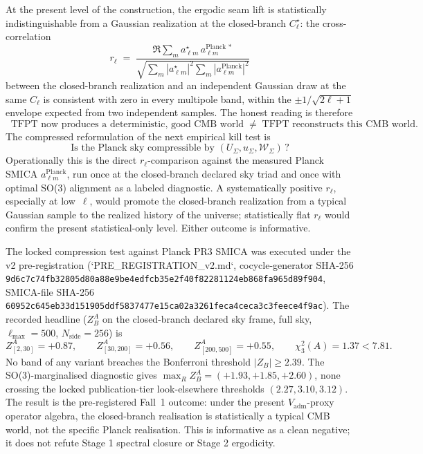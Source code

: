 
\begin{remark}
\label{rem:good-vs-this-cmb-world}
At the present level of the construction, the ergodic seam lift is statistically indistinguishable
from a Gaussian realization at the closed-branch $C_\ell^\star$: the cross-correlation
\[
r_\ell\;=\;\frac{\Re\sum_m a_{\ell m}^{\star}\,a_{\ell m}^{\mathrm{Planck}\,\ast}}
{\sqrt{\sum_m|a_{\ell m}^{\star}|^2\sum_m|a_{\ell m}^{\mathrm{Planck}}|^2}}
\]
between the closed-branch realization and an independent Gaussian draw at the same $C_\ell$ is
consistent with zero in every multipole band, within the $\pm1/\sqrt{2\ell+1}$ envelope expected
from two independent samples. The honest reading is therefore
\[
\boxed{\;
\text{TFPT now produces a deterministic, good CMB world}
\;\;\neq\;\;
\text{TFPT reconstructs this CMB world.}
\;}
\]
The compressed reformulation of the next empirical kill test is
\[
\boxed{\;
\text{Is the Planck sky compressible by }(U_\Sigma,u_\Sigma,\mathcal W_\Sigma)\,?
\;}
\]
Operationally this is the direct $r_\ell$-comparison against the measured Planck SMICA
$a_{\ell m}^{\mathrm{Planck}}$, run once at the closed-branch declared sky triad and once with
optimal SO(3) alignment as a labeled diagnostic. A systematically positive $r_\ell$, especially at
low~$\ell$, would promote the closed-branch realization from a typical Gaussian sample to the
realized history of the universe; statistically flat $r_\ell$ would confirm the present
statistical-only level. Either outcome is informative.
\end{remark}

\begin{remark}
\label{rem:smica-v2-result}
The locked compression test against Planck PR3 SMICA was executed under the v2
pre-registration (`PRE\_REGISTRATION\_v2.md`,
cocycle-generator SHA-256
\texttt{9d6c7c74fb32805d80a88e9be4edfcb35e2f40f82281124eb868fa965d89f904},
SMICA-file SHA-256
\texttt{60952c645eb33d151905ddf5837477e15ca02a3261feca4ceca3c3feece4f9ac}).
The recorded headline ($Z_B^A$ on the closed-branch declared sky frame, full sky,
$\ell_{\max}=500$, $N_{\mathrm{side}}=256$) is
\[
Z_{[2,30]}^A=+0.87,\qquad
Z_{[30,200]}^A=+0.56,\qquad
Z_{[200,500]}^A=+0.55,
\qquad\chi_3^2(A)=1.37<7.81.
\]
No band of any variant breaches the Bonferroni threshold $|Z_B|\ge 2.39$. The SO(3)-marginalised
diagnostic gives $\max_R Z_B^A=(+1.93,+1.85,+2.60)$, none crossing the locked publication-tier
look-elsewhere thresholds $(2.27,3.10,3.12)$. The result is the pre-registered Fall~1 outcome:
under the present $V_{\mathrm{adm}}$-proxy operator algebra, the closed-branch realisation is
statistically a typical CMB world, not the specific Planck realisation. This is informative as a
clean negative; it does not refute Stage 1 spectral closure or Stage 2 ergodicity.
\end{remark}

